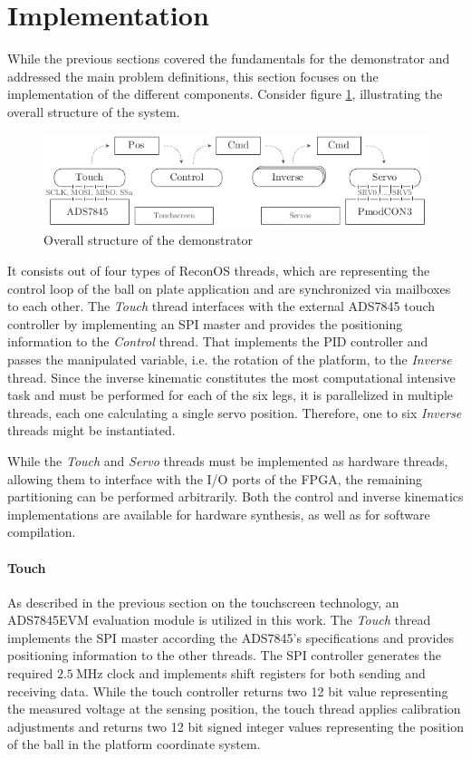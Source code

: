 \section{Implementation}
While the previous sections covered the fundamentals for the demonstrator and
addressed the main problem definitions, this section focuses on the
implementation of the different components. Consider figure
\ref{fig:demo_structure}, illustrating the overall structure of the system.
\begin{figure}
	\centering
	\includegraphics{../figures/demo_structure}
	\caption{Overall structure of the demonstrator}
	\label{fig:demo_structure}
\end{figure}
It consists out of four types of ReconOS threads, which are representing the
control loop of the ball on plate application and are synchronized via
mailboxes to each other. The \emph{Touch} thread interfaces with the external
ADS7845 touch controller by implementing an \ac{SPI} master and provides the
positioning information to the \emph{Control} thread. That implements the
\ac{PID} controller and passes the manipulated variable, i.e. the rotation of
the platform, to the \emph{Inverse} thread. Since the inverse kinematic
constitutes the most computational intensive task and must be performed for
each of the six legs, it is parallelized in multiple threads, each one
calculating a single servo position. Therefore, one to six
\emph{Inverse} threads might be instantiated.

While the \emph{Touch} and \emph{Servo} threads must be implemented as
hardware threads, allowing them to interface with the I/O ports of the FPGA,
the remaining partitioning can be performed arbitrarily. Both the control and
inverse kinematics implementations are available for hardware synthesis, as
well as for software compilation.

\paragraph{Touch} As described in the previous section on the touchscreen
technology, an ADS7845EVM evaluation module is utilized in this work. The
\emph{Touch} thread implements the \ac{SPI} master according the ADS7845's
specifications and provides positioning information to the other threads. The
\ac{SPI} controller generates the required $\SI{2.5}{\mega\hertz}$ clock and
implements shift registers for both sending and receiving data. While the
touch controller returns two 12 bit value representing the measured voltage at
the sensing position, the touch thread applies calibration adjustments and
returns two 12 bit signed integer values representing the position of the ball
in the platform coordinate system.

